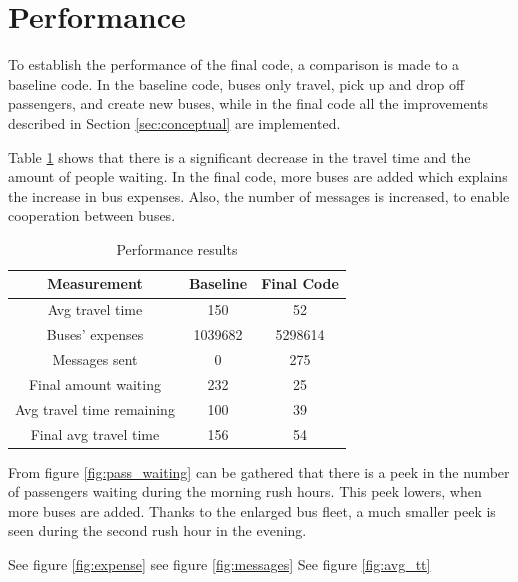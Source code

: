 \section{Performance}

To establish the performance of the final code, a comparison is made to a baseline code. In the baseline code, buses only travel, pick up and drop off passengers, and create new buses, while in the final code all the improvements described in Section \ref{sec:conceptual} are implemented.

Table \ref{table:table1} shows that there is a significant decrease in the travel time and the amount of people waiting. In the final code, more buses are added which explains the increase in bus expenses. Also, the number of messages is increased, to enable cooperation between buses. 

\begin{table}[htbp]
\centering
\begin{tabular}{ |c|c|c|  }
 \hline
  Measurement & Baseline & Final Code \\
 \hline
  Avg travel time & 150 & 52 \\
  Buses' expenses & 1039682 & 5298614 \\
  Messages sent & 0 & 275  \\
  Final amount waiting & 232 & 25 \\
  Avg travel time remaining & 100 & 39 \\
  Final avg travel time & 156 & 54 \\
 \hline
\end{tabular}
\label{table:table1}
\caption{Performance results}
\end{table}


From figure \ref{fig:pass_waiting} can be gathered that there is a peek in the number of passengers waiting during the morning rush hours. This peek lowers, when more buses are added. Thanks to the enlarged bus fleet, a much smaller peek is seen during the second rush hour in the evening.

See figure \ref{fig:expense}
see figure \ref{fig:messages}
See figure \ref{fig:avg_tt}

